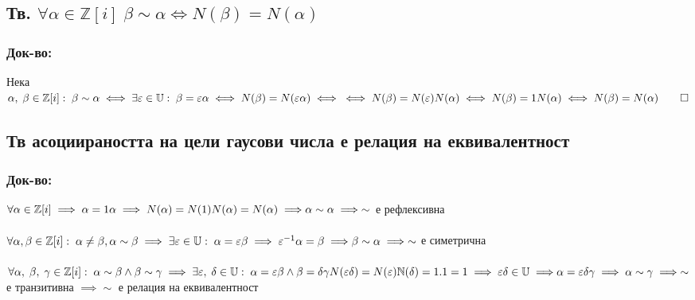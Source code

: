 \documentclass[12pt]{article}
\newcommand{\Z}{\mathbb{Z}}
\newcommand{\N}{\mathbb{N}}
\newcommand{\Rev}{\mathbb{U}}
\begin{document}
    \subsection*{Тв. \(\forall \alpha \in \Z[i] \; \beta \sim \alpha \iff N(\beta) = N(\alpha) \)}
    \subsubsection*{Док-во:}
    Нека \(\alpha, \; \beta \in \Z[i] : \; \beta \sim \alpha \iff \exists \varepsilon \in \Rev : \; \beta = \varepsilon\alpha \iff N(\beta) = N(\varepsilon\alpha) \iff  \\\\
    \iff N(\beta) = N(\varepsilon)N(\alpha) \iff N(\beta) = 1N(\alpha) \iff N(\beta) = N(\alpha) \qed \)
    \subsection*{Тв асоциираността на цели гаусови числа е релация на еквивалентност}
    \subsubsection*{Док-во:}
    \(\forall \alpha \in \Z[i] \implies \alpha = 1\alpha \implies N(\alpha) = N(1)N(\alpha) = N(\alpha) \implies \\\\
    \alpha \sim \alpha \implies \sim\) е рефлексивна \\\\
    \(\forall \alpha, \beta \in \Z[i] : \; \alpha \neq \beta, \alpha \sim \beta \implies \exists \varepsilon \in \Rev : \; \alpha = \varepsilon\beta \implies \varepsilon^{-1}\alpha = \beta \implies \\\\
    \beta \sim \alpha \implies \sim\) е симетрична \\\\
    \(\forall \alpha, \; \beta, \; \gamma \in \Z[i] : \; \alpha \sim \beta \wedge \beta \sim \gamma \implies \exists \varepsilon, \; \delta \in \Rev : \; \alpha = \varepsilon\beta \wedge \beta = \delta\gamma \\\\
    N(\varepsilon\delta) = N(\varepsilon)\N(\delta) = 1.1 = 1 \implies \varepsilon\delta \in \Rev \implies \\\\
    \alpha = \varepsilon\delta\gamma \implies \alpha \sim \gamma \implies \sim\) е транзитивна \(\implies \sim\) е релация на еквивалентност
\end{document}
